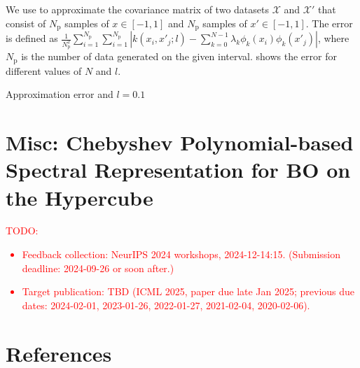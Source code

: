 \documentclass{article}
\begin{document}
We use  to approximate the covariance matrix of two datasets $\mathcal{X}$ and $\mathcal{X}'$ that consist of $N_\text{p}$ samples of $x \in [-1,1]$ and $N_\text{p}$ samples of $x' \in [-1,1]$.
The error is defined as $\frac{1}{N_\text{p}^2} \sum_{i=1}^{N_\text{p}} \sum_{i=1}^{N_\text{p}}| k(x_i,x'_j;l) -  \sum_{k=0}^{N-1} \lambda_k \phi_k(x_i) \phi_k(x'_j)|$, where $N_\text{p}$ is the number of data generated on the given interval.
 shows the error for different values of $N$ and $l$.


Approximation error and $l=0.1$
%

\section{Misc: Chebyshev Polynomial-based Spectral Representation
  for BO on the Hypercube}

\textcolor{red}{TODO:
\begin{itemize}
\item
  Feedback collection: NeurIPS 2024 workshops, 2024-12-14:15.
  (Submission deadline: 2024-09-26 or soon after.)
\item
  Target publication: TBD (ICML 2025, paper due late Jan 2025; previous
  due dates: 2024-02-01, 2023-01-26, 2022-01-27, 2021-02-04,
  2020-02-06).
\end{itemize}
}



\section*{References}


\end{document}
